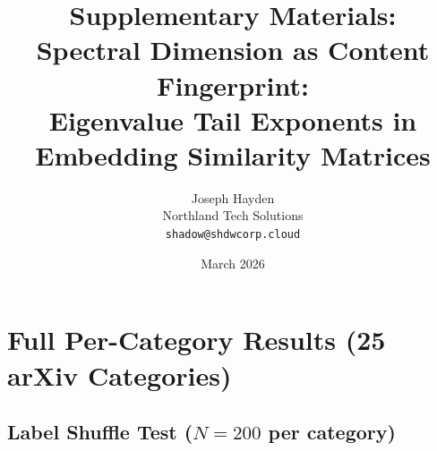 \documentclass[11pt,letterpaper]{article}
\title{Supplementary Materials:\\
Spectral Dimension as Content Fingerprint:\\
Eigenvalue Tail Exponents in Embedding Similarity Matrices}
\author{Joseph Hayden \\
Northland Tech Solutions \\
\texttt{shadow@shdwcorp.cloud}}
\date{March 2026}
\begin{document}
\maketitle

\tableofcontents
\newpage

\section{Full Per-Category Results (25 arXiv Categories)}
\label{sec:full_arxiv}

\subsection{Label Shuffle Test ($N = 200$ per category)}
\end{document}
